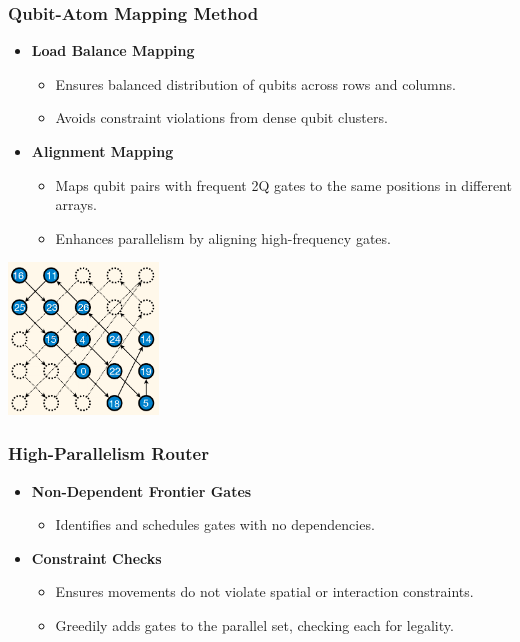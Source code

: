 \documentclass[18 pt]{beamer}
\begin{document}
\begin{frame}
    \frametitle{Qubit-Atom Mapping Method}
    \begin{itemize}
        \item \textbf{Load Balance Mapping}
        \begin{itemize}
            \item Ensures balanced distribution of qubits across rows and columns.
            \item Avoids constraint violations from dense qubit clusters.
        \end{itemize}
        \item \textbf{Alignment Mapping}
        \begin{itemize}
            \item Maps qubit pairs with frequent 2Q gates to the same positions in different arrays.
            \item Enhances parallelism by aligning high-frequency gates.
        \end{itemize}
    \end{itemize}
    \begin{center}
        \includegraphics[width=0.3\textwidth]{load.png}
    \end{center}
\end{frame}

\begin{frame}
    \frametitle{High-Parallelism Router}
    \begin{itemize}
        \item \textbf{Non-Dependent Frontier Gates}
        \begin{itemize}
            \item Identifies and schedules gates with no dependencies.
        \end{itemize}
        \item \textbf{Constraint Checks}
        \begin{itemize}
            \item Ensures movements do not violate spatial or interaction constraints.
            \item Greedily adds gates to the parallel set, checking each for legality.
        \end{itemize}
    \end{itemize}
\end{frame}
\end{document}
